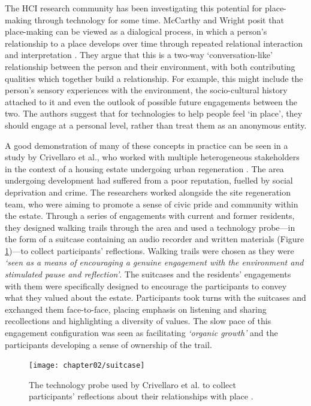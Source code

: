 The HCI research community has been investigating this potential for place-making through technology for some time. McCarthy and Wright posit that place-making can be viewed as a dialogical process, in which a person's relationship to a place develops over time through repeated relational interaction and interpretation \citep{McCarthy2005}. They argue that this is a two-way `conversation-like' relationship between the person and their environment, with both contributing qualities which together build a relationship. For example, this might include the person's sensory experiences with the environment, the socio-cultural history attached to it and even the outlook of possible future engagements between the two. The authors suggest that for technologies to help people feel `in place', they should engage at a personal level, rather than treat them as an anonymous entity. 

A good demonstration of many of these concepts in practice can be seen in a study by Crivellaro et al., who worked with multiple heterogeneous stakeholders in the context of a housing estate undergoing urban regeneration \citep{Crivellaro2016}. The area undergoing development had suffered from a poor reputation, fuelled by social deprivation and crime. The researchers worked alongside the site regeneration team, who were aiming to promote a sense of civic pride and community within the estate. Through a series of engagements with current and former residents, they designed walking trails through the area and used a technology probe---in the form of a suitcase containing an audio recorder and written materials (Figure \ref{fig:suitcase})---to collect participants' reflections. Walking trails were chosen as they were \textit{`seen as a means of encouraging a genuine engagement with the environment and stimulated pause and reflection'}. The suitcases and the residents' engagements with them were specifically designed to encourage the participants to convey what they valued about the estate. Participants took turns with the suitcases and exchanged them face-to-face, placing emphasis on listening and sharing recollections and highlighting a diversity of values. The slow pace of this engagement configuration was seen as facilitating \textit{`organic growth'} and the participants developing a sense of ownership of the trail. 

\begin{figure}
\texttt{[image: chapter02/suitcase]}
\caption[Crivellaro et al.'s technology probe]{The technology probe used by Crivellaro et al. to collect participants' reflections about their relationships with place \citep{Crivellaro2016}.}
\label{fig:suitcase} \end{figure}

